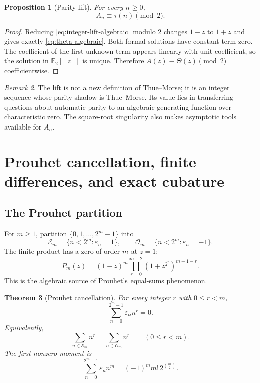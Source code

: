 \documentclass[11pt,oneside]{article}
\newtheorem{theorem}{Theorem}[section]
\newtheorem{proposition}[theorem]{Proposition}
\theoremstyle{definition}
\theoremstyle{remark}
\newtheorem{remark}[theorem]{Remark}
\newcommand{\Ftwo}{\mathbb F_2}
\newcommand{\eps}{\varepsilon}
\begin{document}
\begin{proposition}[Parity lift]\label{prop:integer-lift-parity}
For every $n\ge0$,
\begin{equation}\label{eq:integer-lift-parity}
 A_n\equiv\tau(n)\pmod2.
\end{equation}
\end{proposition}

\begin{proof}
Reducing \cref{eq:integer-lift-algebraic} modulo $2$ changes $1-z$ to $1+z$
and gives exactly \cref{eq:theta-algebraic}.  Both formal solutions have
constant term zero.  The coefficient of the first unknown term appears
linearly with unit coefficient, so the solution in $\Ftwo[[z]]$ is unique.
Therefore $A(z)\equiv\Theta(z)\pmod2$ coefficientwise.
\end{proof}

\begin{remark}
The lift is not a new definition of Thue--Morse; it is an integer sequence whose
parity shadow is Thue--Morse.  Its value lies in transferring questions about
automatic parity to an algebraic generating function over characteristic zero.
The square-root singularity also makes asymptotic tools available for $A_n$.
\end{remark}

\section{Prouhet cancellation, finite differences, and exact cubature}

\subsection{The Prouhet partition}

For $m\ge1$, partition $\{0,1,\ldots,2^m-1\}$ into
\begin{equation}\label{eq:prouhet-partition}
 \mathcal E_m=\{n<2^m:\eps_n=1\},
 \qquad
 \mathcal O_m=\{n<2^m:\eps_n=-1\}.
\end{equation}
The finite product has a zero of order $m$ at $z=1$:
\begin{equation}\label{eq:P-zero-order}
 P_m(z)=(1-z)^m
 \prod_{r=0}^{m-2}(1+z^{2^r})^{m-1-r}.
\end{equation}
This is the algebraic source of Prouhet's equal-sums phenomenon.

\begin{theorem}[Prouhet cancellation]\label{thm:prouhet}
For every integer $r$ with $0\le r<m$,
\begin{equation}\label{eq:prouhet-moments}
 \sum_{n=0}^{2^m-1}\eps_n n^r=0.
\end{equation}
Equivalently,
\begin{equation}\label{eq:prouhet-equal-powers}
 \sum_{n\in\mathcal E_m}n^r
 =\sum_{n\in\mathcal O_m}n^r
 \qquad(0\le r<m).
\end{equation}
The first nonzero moment is
\begin{equation}\label{eq:first-nonzero-moment}
 \sum_{n=0}^{2^m-1}\eps_n n^m
 =(-1)^m m!\,2^{\binom m2}.
\end{equation}
\end{theorem}
\end{document}
